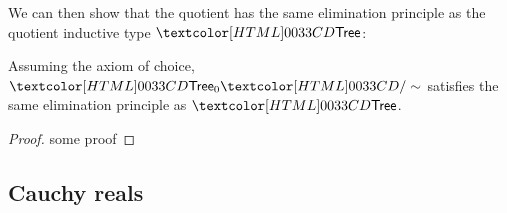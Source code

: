 We can then show that the quotient has the same elimination principle
as the quotient inductive type $\treety$:

\begin{proposition}
  Assuming the axiom of choice, $\quotty{\pretreety}{\treerel}$
  satisfies the same elimination principle as $\treety$.
\end{proposition}

\begin{proof}
  some proof
\end{proof}

\subsection{Cauchy reals}


